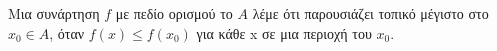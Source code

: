 Μια συνάρτηση $f$ με πεδίο ορισμού το $ A $ λέμε ότι παρουσιάζει τοπικό μέγιστο στο $ x_0\in A $, όταν $ f(x)\leq f(x_0) $ για κάθε x σε μια περιοχή του $ x_0 $.
